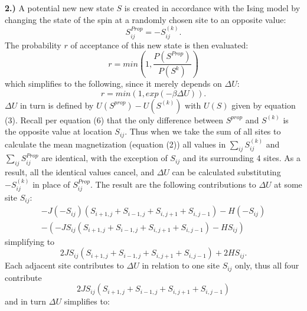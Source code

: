 \documentclass{article}
\begin{document}
\paragraph{} \hspace{0pt} \\
\noindent
\textbf{2.)} A potential new new state $S$ is created in accordance with the Ising model by changing the state of the spin at a randomly chosen site to an opposite value:
\begin{equation}
S^{Prop}_{ij} = -S^{(k)}_{ij}.
\end{equation}
The probability $r$ of acceptance of this new state is then evaluated:
\begin{equation}
r = min(1,\frac{P(S^{Prop})}{P(S^{k})})
\end{equation}
which simplifies to the following, since it merely depends on $\Delta U:$
\begin{equation}
r = min(1, exp(-\beta \Delta U)).
\end{equation}
$\Delta U$ in turn is defined by $U(S^{prop}) - U(S^{(k)})$ with $U(S)$ given by equation (3). Recall per equation (6) that the only difference between $S^{prop}$ and $S^{(k)}$ is the opposite value at location $S_{ij}$. Thus when we take the sum of all sites to calculate the mean magnetization (equation (2)) all values in $\sum_{ij}S^{(k)}_{ij}$ and $\sum_{ij}S^{Prop}_{ij}$ are identical, with the exception of $S_{ij}$ and its surrounding 4 sites. As a result, all the identical values cancel, and $\Delta U$ can be calculated substituting $-S_{ij}^{(k)}$ in place of $S_{ij}^{Prop}$. The result are the following contributions to $\Delta U$ at some site $S_{ij}:$
\begin{equation}
\begin{aligned}
-J (-S_{ij})(S_{i+1, j} + S_{i-1, j} + S_{i,j+1} + S_{i,j-1})- H(-S_{ij}) \\ - ( -JS_{ij}(S_{i+1, j} + S_{i-1, j} + S_{i,j+1} + S_{i,j-1}) - HS_{ij})
\end{aligned}
\end{equation}
simplifying to 
\begin{equation}
2JS_{ij}(S_{i+1, j} + S_{i-1, j} + S_{i,j+1} + S_{i,j-1}) + 2HS_{ij}.
\end{equation}
Each adjacent site contributes to $\Delta U$ in relation to one site $S_{ij}$ only, thus all four contribute
\begin{equation}
2JS_{ij}(S_{i+1, j} + S_{i-1, j} + S_{i,j+1} + S_{i,j-1})
\end{equation}
and in turn $\Delta U$ simplifies to:
\end{document}
